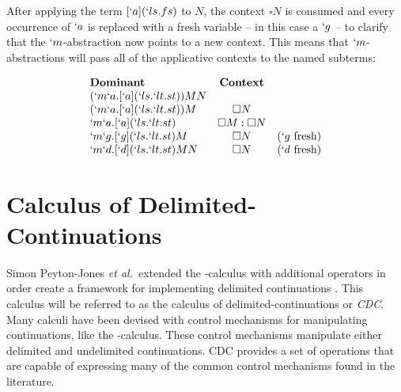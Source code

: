   After applying the term $[`a](`ls.fs)$ to $N$, 
  the context $\square N$ is consumed and every occurrence of $`a$ is replaced with a fresh variable 
  -- in this case a $`g$ -- 
  to clarify that the $`m$-abstraction now points to a new context. 
  This means that $`m$-abstractions will pass all of the applicative contexts to the named subterms:
  
  \begin{example}
    \[
    \begin{array}{lcr}
    \textbf{Dominant} & \textbf{Context} \\
    (`m`a.[`a](`ls.`lt.st)) M N \\
    (`m`a.[`a](`ls.`lt.st))M & \square N \\
    `m`a.[`a](`ls.`lt.st) & \square M:\square N \\
    `m`g.[`g](`ls.`lt.st)M & \square N & (`g\ \text{fresh}) \\
    `m`d.[`d](`ls.`lt.st)MN & \square N & (`d\ \text{fresh}) \\
    \end{array}
    \]
  \end{example}
  

\section{Calculus of Delimited-Continuations}


  Simon Peyton-Jones \textit{et al.}\ extended the \lam-calculus with additional operators in order create a framework for implementing delimited continuations \cite{JonesDS07}. 
  This calculus will be referred to as the calculus of delimited-continuations or \emph{CDC}. 
  Many calculi have been devised with control mechanisms for manipulating continuations, like the \lmu-calculus.
  These control mechanisms manipulate either delimited and undelimited continuations. 
  CDC provides a set of operations that are capable of expressing many of the common control mechanisms found in the literature.

